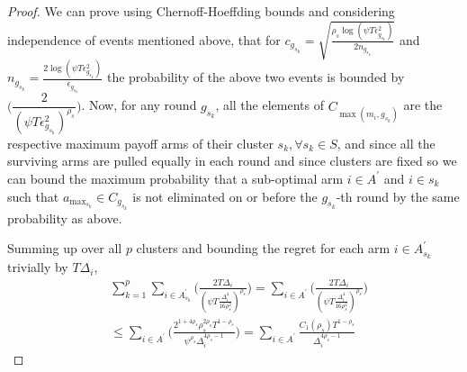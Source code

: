 \begin{proof}
We can prove using Chernoff-Hoeffding bounds and considering independence of events mentioned above, that for $c_{g_{s_{k}}}=\sqrt{\frac{\rho_{s} \log (\psi T\epsilon_{g_{s_{k}}}^{2})}{2 n_{g_{s_{k}}}}}$ and  $n_{g_{s_{k}}}=\frac{2\log{(\psi T\epsilon_{g_{s_{k}}}^{2})}}{\epsilon_{g_{s_{k}}}}$ the probability of the above two events is bounded by $\bigg(\dfrac{2}{(\psi  T\epsilon_{g_{s_{k}}}^{2})^{\rho_{s}}}\bigg)$.
  Now, for any round $g_{s_{k}}$, all the elements of $C_{\max(m_{i},g_{s_{k}})}$ are the respective maximum payoff arms of their cluster $s_{k}, \forall s_{k}\in S$, and since all the surviving arms are pulled equally in each round and since clusters are fixed so we can bound the maximum probability that a sub-optimal arm ${i}\in A^{'}$  and ${i}\in s_{k}$ such that $a_{\max_{s_{k}}}\in C_{g_{s_{k}}}$ is not eliminated on or before the $g_{s_{k}}$-th round by the same probability as above. 

 

Summing up over all $p$ clusters and bounding the regret for each arm $i\in A_{s_{k}}^{'}$ trivially by $T\Delta_{i}$,
 \begin{align*}
 &\sum_{k=1}^{p}\sum_{i\in A_{s_{k}}^{'}}\bigg(\frac{2T\Delta_{i}}{(\psi T\frac{\Delta_{i}^{4}}{16\rho_{s}^{2}})^{\rho_{s}}}\bigg) = \sum_{i\in A^{'}}\bigg(\frac{2T\Delta_{i}}{(\psi  T\frac{\Delta_{i}^{4}}{16\rho_{s}^{2}})^{\rho_{s}}}\bigg) \\
 &\leq \sum_{i\in A^{'}}\bigg(\frac{2^{1+4\rho_{s}}\rho_{s}^{2\rho_{s}}T^{1-\rho_{s}}}{\psi^{\rho_{s}}\Delta_{i}^{4\rho_{s}-1}}\bigg) = \sum_{i\in A^{'}}\frac{C_{1}(\rho_{s})T^{1-\rho_{s}}}{\Delta_{i}^{4\rho_{s}-1}}
 \end{align*}




\end{proof}
